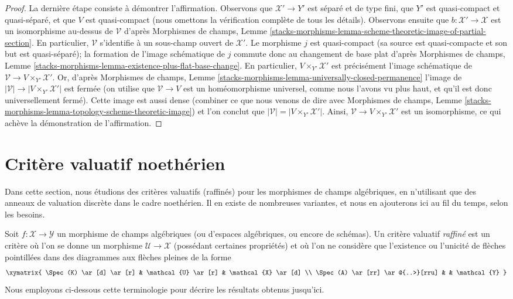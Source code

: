 \begin{proof}
\medskip\noindent
La dernière étape consiste à démontrer l'affirmation.
Observons que $\mathcal{X}' \to Y'$ est séparé et de type fini,
que $Y'$ est quasi-compact et quasi-séparé, et que $V$ est quasi-compact
(nous omettons la vérification complète de tous les détails).
Observons ensuite que
$b : \mathcal{X}' \to \mathcal{X}$ est un isomorphisme au-dessus de
$\mathcal{V}$ d'après Morphismes de champs, Lemme
\ref{stacks-morphisms-lemma-scheme-theoretic-image-of-partial-section}.
En particulier, $\mathcal{V}$ s'identifie à un sous-champ ouvert
de $\mathcal{X}'$.
Le morphisme $j$ est quasi-compact
(sa source est quasi-compacte et son but est quasi-séparé); la formation
de l'image schématique de $j$ commute donc au changement de base plat d'après
Morphismes de champs, Lemme
\ref{stacks-morphisms-lemma-existence-plus-flat-base-change}.
En particulier, $V \times_{Y'} \mathcal{X}'$ est précisément
l'image schématique de
$\mathcal{V} \to V \times_{Y'} \mathcal{X}'$.
Or, d'après Morphismes de champs, Lemme
\ref{stacks-morphisms-lemma-universally-closed-permanence}
l'image de $|\mathcal{V}| \to |V \times_{Y'} \mathcal{X}'|$
est fermée (on utilise que $\mathcal{V} \to V$ est un homéomorphisme universel,
comme nous l'avons vu plus haut, et qu'il est donc universellement fermé).
Cette image est aussi dense (combiner ce que nous venons de dire avec
Morphismes de champs, Lemme
\ref{stacks-morphisms-lemma-topology-scheme-theoretic-image})
et l'on conclut que $|\mathcal{V}| = |V \times_{Y'} \mathcal{X}'|$.
Ainsi, $\mathcal{V} \to V \times_{Y'} \mathcal{X}'$ est un
isomorphisme, ce qui achève la démonstration de l'affirmation.
\end{proof}




\section{Critère valuatif noethérien}
\label{section-Noetherian-valuative-criterion}

\noindent
Dans cette section, nous étudions des critères valuatifs (raffinés) pour les
morphismes de champs algébriques, en n'utilisant que des anneaux de valuation discrète
dans le cadre noethérien. Il en existe de nombreuses variantes,
et nous en ajouterons ici au fil du temps, selon les besoins.

\medskip\noindent
Soit $f : \mathcal{X} \to \mathcal{Y}$ un morphisme de champs algébriques
(ou d'espaces algébriques, ou encore de schémas). Un critère valuatif {\it raffiné}
est un critère où l'on se donne un morphisme $\mathcal{U} \to \mathcal{X}$
(possédant certaines propriétés) et où l'on ne considère que l'existence ou l'unicité
de flèches pointillées dans des diagrammes aux flèches pleines de la forme
$$
\xymatrix{
\Spec(K) \ar[d] \ar[r] & \mathcal{U} \ar[r] & \mathcal{X} \ar[d] \\
\Spec(A) \ar[rr] \ar@{..>}[rru] & & \mathcal{Y}
}
$$
Nous employons ci-dessous cette terminologie pour décrire les résultats obtenus jusqu'ici.

